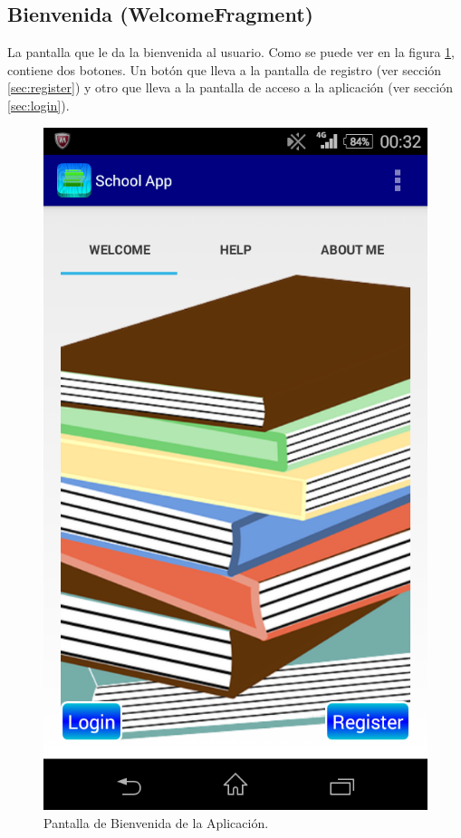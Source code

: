 		\subsection{Bienvenida ({\ttfamily WelcomeFragment})} \label{sec:welcome}
			La pantalla que le da la bienvenida al usuario. Como se puede ver en la figura \ref{fig:welcome}, contiene dos botones. Un botón que lleva a la pantalla de registro (ver sección \ref{sec:register}) y otro que lleva a la pantalla de acceso a la aplicación (ver sección \ref{sec:login}).
			
			\begin{figure}[h !]
				\centering
				\includegraphics[scale=0.4]{Imagenes/App/welcome}
				\caption{Pantalla de Bienvenida de la Aplicación.}
				\label{fig:welcome}
			\end{figure}
		
